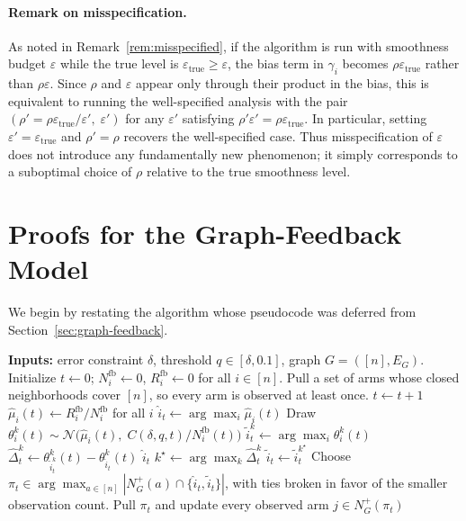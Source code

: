 \documentclass{article}
\begin{document}
\paragraph{Remark on misspecification.}
As noted in Remark~\ref{rem:misspecified}, if the algorithm is run with
smoothness budget $\varepsilon$ while the true level is
$\varepsilon_{\mathrm{true}}\ge\varepsilon$, the bias term in $\gamma_i$ becomes
$\rho\varepsilon_{\mathrm{true}}$ rather than $\rho\varepsilon$. Since $\rho$
and $\varepsilon$ appear only through their product in the bias, this is
equivalent to running the well-specified analysis with the pair
$(\rho'=\rho\varepsilon_{\mathrm{true}}/\varepsilon',\;\varepsilon')$ for any
$\varepsilon'$ satisfying $\rho'\varepsilon'=\rho\varepsilon_{\mathrm{true}}$.
In particular, setting $\varepsilon'=\varepsilon_{\mathrm{true}}$ and
$\rho'=\rho$ recovers the well-specified case. Thus misspecification of
$\varepsilon$ does not introduce any fundamentally new phenomenon; it simply
corresponds to a suboptimal choice of $\rho$ relative to the true smoothness
level.




\section{Proofs for the Graph-Feedback Model}
\label{app:proofs-feedback}

We begin by restating the algorithm whose pseudocode was deferred from Section~\ref{sec:graph-feedback}.

\begin{algorithm}[H]
\caption{\texttt{TS-Explore-GF} (graph feedback)}
\label{algo:ts-explore-gf}
\begin{algorithmic}[1]
\State \textbf{Inputs:} error constraint $\delta$, threshold $q\in[\delta,0.1]$, graph $G=([n],E_G)$.
\State Initialize $t\gets 0$; $N_i^{\mathrm{fb}}\gets 0$, $R_i^{\mathrm{fb}}\gets 0$ for all $i\in[n]$.
\State Pull a set of arms whose closed neighborhoods cover $[n]$, so every arm is observed at least once.
    \State $t\gets t+1$
    \State $\widehat\mu_i(t)\gets R_i^{\mathrm{fb}}/N_i^{\mathrm{fb}}$ for all $i$
    \State $\widehat i_t\gets \arg\max_i \widehat\mu_i(t)$
            \State Draw $\theta_i^k(t)\sim \mathcal N\!\bigl(\widehat\mu_i(t),\;C(\delta,q,t)/N_i^{\mathrm{fb}}(t)\bigr)$
        \EndFor
        \State $\widetilde i_t^k\gets \arg\max_i \theta_i^k(t)$
        \State $\widehat\Delta_t^k\gets \theta_{\widetilde i_t^k}^k(t)-\theta_{\widehat i_t}^k(t)$
    \EndFor
        \State \Return $\widehat i_t$
    \Else
        \State $k^\star\gets \arg\max_k \widehat\Delta_t^k$
        \State $\widetilde i_t\gets \widetilde i_t^{k^\star}$
        \State Choose $\pi_t\in\arg\max_{a\in[n]} |N_G^+(a)\cap\{\widehat i_t,\widetilde i_t\}|$, with ties broken in favor of the smaller observation count.
        \State Pull $\pi_t$ and update every observed arm $j\in N_G^+(\pi_t)$
    \EndIf
\EndWhile
\end{algorithmic}
\end{algorithm}
\end{document}
